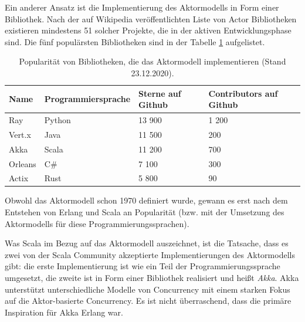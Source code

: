 Ein anderer Ansatz ist die Implementierung des Aktormodells in Form einer Bibliothek. Nach der auf Wikipedia veröffentlichten Liste von Actor Bibliotheken existieren mindestens 51 solcher Projekte, die in der aktiven Entwicklungsphase sind. Die fünf populärsten Bibliotheken sind in der Tabelle \ref{tab:vergleichBibliotheken} aufgelistet.

\begin{table} \centering
	\begin{tabular}{|p{1.5cm}|p{4cm}|p{4cm}|p{4cm}|} 
		\hline
		\textbf{Name} & \textbf{Programmiersprache} & \textbf{Sterne auf Github} & \textbf{Contributors auf Github}\\
		
		\hline
		Ray & Python & 13 900 & 1 200 \\
		
		\hline
		Vert.x & Java & 11 500 & 200 \\
		
		\hline
		Akka & Scala & 11 200 & 700 \\
		
		\hline
		Orleans & C\# & 7 100 & 300 \\
		
		\hline
		Actix & Rust & 5 800 & 90 \\

		\hline
	\end{tabular}
	\caption{Popularität von Bibliotheken, die das Aktormodell implementieren (Stand 23.12.2020).}
	\label{tab:vergleichBibliotheken}
\end{table}

Obwohl das Aktormodell schon 1970 definiert wurde, gewann es erst nach dem Entstehen von Erlang und Scala an Popularität (bzw. mit der Umsetzung des Aktormodells für diese Programmierungssprachen). 

Was Scala im Bezug auf das Aktormodell auszeichnet, ist die Tatsache, dass es zwei von der Scala Community akzeptierte Implementierungen des Aktormodells gibt: die erste Implementierung ist wie ein Teil der Programmierungssprache umgesetzt, die zweite ist in Form einer Bibliothek realisiert und heißt \textit{Akka}. Akka unterstützt unterschiedliche Modelle von Concurrency mit einem starken Fokus auf die Aktor-basierte Concurrency. Es ist nicht überraschend, dass die primäre Inspiration für Akka Erlang war.


